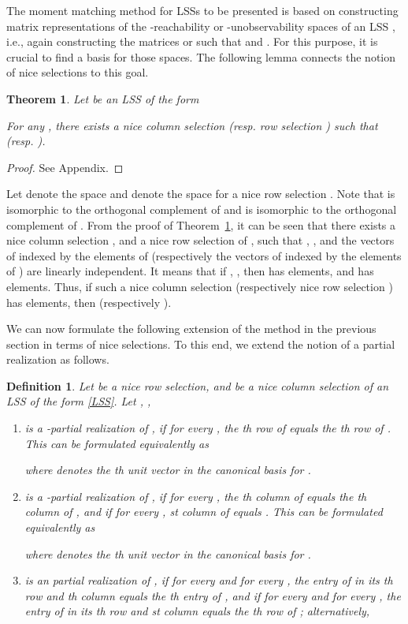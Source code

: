 \documentclass[journal]{IEEEtran}
\newtheorem{Definition}{Definition}
\newtheorem{Theorem}{Theorem}
\begin{document}
The moment matching method for LSSs to be presented is based on constructing matrix representations of the -reachability or -unobservability spaces of an LSS , i.e., again constructing the matrices  or  such that  and . For this purpose, it is crucial to find a basis for those spaces. The following lemma connects the notion of nice selections to this goal.

\begin{Theorem} \label{lem:nice_selections}
	Let  be an LSS of the form 
	
	For any , there exists a nice column selection  (resp. row selection ) such that  (resp. ). 
\end{Theorem}

\begin{proof}
	See Appendix.
\end{proof}

Let  denote the space  and  denote the space  for a nice row selection . Note that  is isomorphic to the orthogonal complement of  and  is isomorphic to the orthogonal complement of . From the proof of Theorem~\ref{lem:nice_selections}, it can be seen that there exists a nice column selection , and a nice row selection of , such that , , and the vectors of  indexed by the elements of  (respectively the vectors of  indexed by the elements of ) are linearly independent. It means that if , , then  has  elements, and  has  elements. Thus, if such a nice column selection  (respectively nice row selection ) has  elements, then  (respectively ).

We can now formulate the following extension of the method in the previous section in terms of nice selections. To this end, we extend the notion of a partial realization as follows.

\begin{Definition} \label{def:alphabeta_partreal}
	Let  be a nice row selection, and  be a nice column selection of an LSS  of the form \eqref{LSS}. Let
	,
	,
	
	\begin{enumerate}
		\item  is a -partial realization of , if for every , the th row of  equals the th row of . This can be formulated equivalently as
		
		where  denotes the th unit vector in the canonical basis for .
		\item  is a -partial realization of , if for every , the th column of  equals the th column of , and if for every , st column of  equals . This can be formulated equivalently as
		
		where  denotes the th unit vector in the canonical basis for .
		\item  is an  partial realization of , if for every  and for every , the entry of  in its th row and th column equals the th entry of , and if for every  and for every , the entry of  in its th row and st column equals the th row of ; alternatively,
		
	\end{enumerate}
	
\end{Definition}
\end{document}
